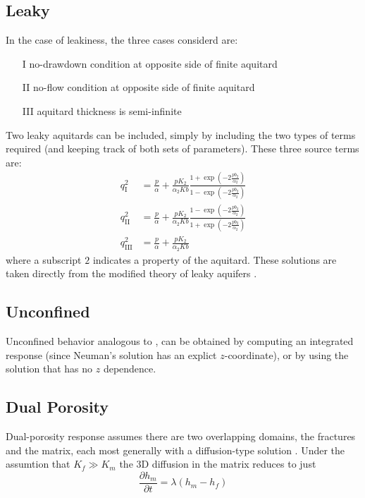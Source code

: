\documentclass{article}
\begin{document}
\subsection{Leaky}
In the case of leakiness, the three cases considerd are:
\begin{enumerate}
\item[I] no-drawdown condition at opposite side of finite aquitard
\item[II] no-flow condition at opposite side of finite aquitard
\item[III] aquitard thickness is semi-infinite
\end{enumerate}
Two leaky aquitards can be included, simply by including the two types
of terms required (and keeping track of both sets of parameters).
These three source terms are:
\begin{align}
  q_{\mathrm{I}}^2 &= \frac{p}{\alpha} + \frac{p K_2}{\alpha_2 Kb} \frac{1 + \exp\left(-2 \frac{p b_2}{\alpha_2}\right)}{1 - \exp\left(-2 \frac{p b_2}{\alpha_2}\right)} \\
  q_{\mathrm{II}}^2 &= \frac{p}{\alpha} + \frac{p K_2}{\alpha_2 Kb} \frac{1 - \exp\left(-2 \frac{p b_2}{\alpha_2}\right)}{1 + \exp\left(-2 \frac{p b_2}{\alpha_2}\right)} \\
  q_{\mathrm{III}}^2 &= \frac{p}{\alpha} + \frac{p K_2}{\alpha_2 Kb} 
\end{align}
where a subscript $2$ indicates a property of the aquitard.  These
solutions are taken directly from the modified theory of leaky
aquifers \cite{hantush1960modification}.

\subsection{Unconfined}
Unconfined behavior analogous to \cite{neuman1972theory}, can be
obtained by computing an integrated response (since Neuman's solution
has an explict $z$-coordinate), or by using the
\cite{boulton1954drawdown} solution that has no $z$ dependence.

\subsection{Dual Porosity}
Dual-porosity response assumes there are two overlapping domains, the
fractures and the matrix, each most generally with a diffusion-type
solution \cite{dougherty1984flow}.  Under the assumtion that $K_f \gg
K_m$ the 3D diffusion in the matrix reduces to just
\begin{equation}
  \label{eq:2}
  \frac{\partial h_m}{\partial t} = \lambda \left( h_m - h_f\right)
\end{equation}



\end{document}
